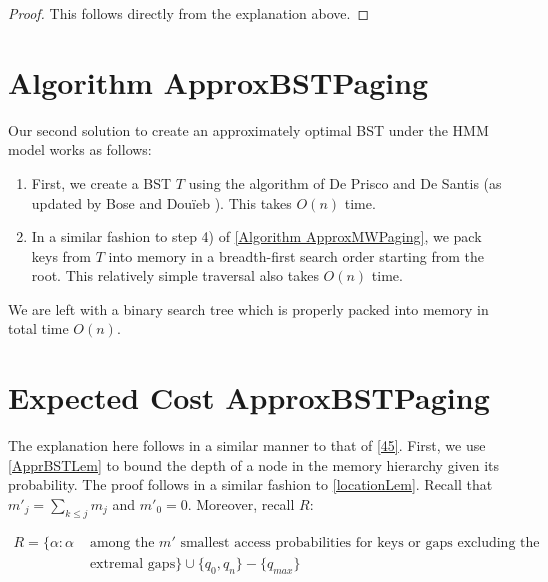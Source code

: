 \documentclass[letterpaper,12pt,titlepage,oneside,final]{book}
\theoremstyle{plain}
\begin{document}
\begin{proof}
This follows directly from the explanation above.
\end{proof}

\section{Algorithm ApproxBSTPaging}\label{Algorithm ApproxBSTPaging}

Our second solution to create an approximately optimal BST under the HMM model works as follows: \\

\begin{enumerate}
\item First, we create a BST $T$ using the algorithm of De Prisco and De Santis \cite{de1993binary} (as updated by Bose and Dou\"{i}eb \cite{bose2009efficient}). This takes $O(n)$ time. \\

\item In a similar fashion to step 4) of \ref{Algorithm ApproxMWPaging}, we pack keys from $T$ into memory in a breadth-first search order starting from the root. This relatively simple traversal also takes $O(n)$ time.
\end{enumerate}

We are left with a binary search tree which is properly packed into memory in total time $O(n)$.


\section{Expected Cost ApproxBSTPaging}\label{48}

The explanation here follows in a similar manner to that of \ref{45}. First, we use \ref{ApprBSTLem} to bound the depth of a node in the memory hierarchy given its probability. The proof follows in a similar fashion to \ref{locationLem}. Recall that $m'_j = \sum_{k \leq j} m_j$ and $m'_0 = 0$. Moreover, recall $R$:

\begin{align*}
R = \{\alpha : \alpha &\text{ among the }m' \text{ smallest access probabilities for keys or gaps excluding the} \\
&\text{ extremal gaps} \} \cup \{q_0, q_n\} - \{q_{max}\}
\end{align*}
\end{document}
